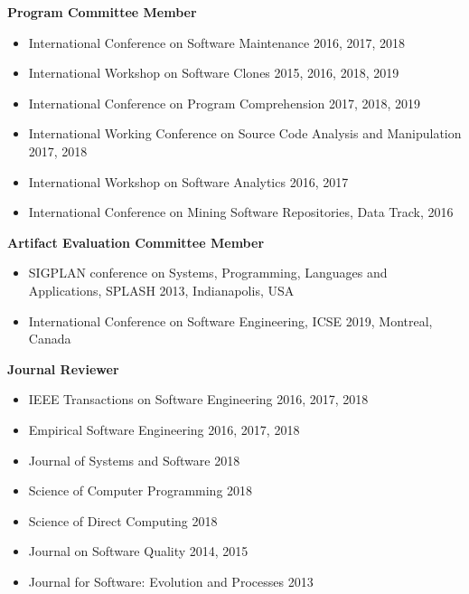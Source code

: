 \documentclass[letterpaper,11pt]{article}
\begin{document}
\textbf{Program Committee Member}


\begin{itemize}

  \item\small{International Conference on Software Maintenance 2016, 2017, 2018}
  \vspace{-5pt}\item\small{International Workshop on Software Clones 2015, 2016, 2018, 2019}
  \vspace{-5pt}\item\small{International Conference on Program Comprehension 2017, 2018, 2019}
  \vspace{-5pt}\item\small{ International Working Conference on Source Code Analysis and Manipulation 2017, 2018}
  \vspace{-5pt}\item\small{ International Workshop on Software Analytics 2016, 2017}
   \vspace{-5pt}\item\small{International Conference on Mining Software Repositories, Data Track, 2016}

\end{itemize}

\textbf{Artifact Evaluation Committee Member}

\begin{itemize}
\item\small{SIGPLAN conference on Systems, Programming, Languages and Applications, SPLASH 2013,
Indianapolis, USA}
  \vspace{-5pt}\item\small{International Conference on Software Engineering, ICSE 2019,
Montreal, Canada}

\end{itemize}

\textbf{Journal Reviewer}

\begin{itemize}

  \item\small{IEEE Transactions on Software Engineering 2016, 2017, 2018}
  \vspace{-5pt}\item\small{Empirical Software Engineering 2016, 2017, 2018}
  \vspace{-5pt}\item\small{Journal of Systems and Software 2018}
  \vspace{-5pt}\item\small{Science of Computer Programming 2018}
  \vspace{-5pt}\item\small{Science of Direct Computing 2018}
  \vspace{-5pt}\item\small{Journal on Software Quality 2014, 2015}
  \vspace{-5pt}\item\small{Journal for Software: Evolution and Processes 2013}

\end{itemize}
\end{document}
